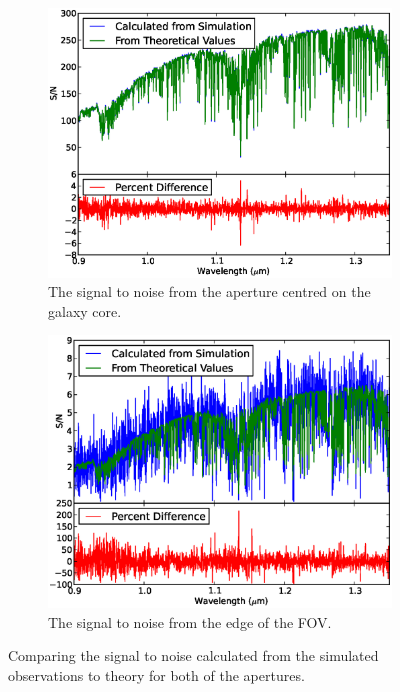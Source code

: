 \documentclass[11pt,twoside]{article}
\begin{document}
\begin{figure}[htp]
\centering  
\begin{subfigure}{0.5\textwidth}
\includegraphics[width=\textwidth]{signal_noise}
\caption{The signal to noise from the aperture centred on the galaxy core.}
\end{subfigure}%
\begin{subfigure}{0.5\textwidth}
\includegraphics[width=\textwidth]{signal_noise_edge}
\caption{The signal to noise from the edge of the FOV.}
\end{subfigure}
\caption{Comparing the signal to noise calculated from the simulated observations to theory for both of the apertures.}
\label{SN}
\end{figure}
\end{document}
